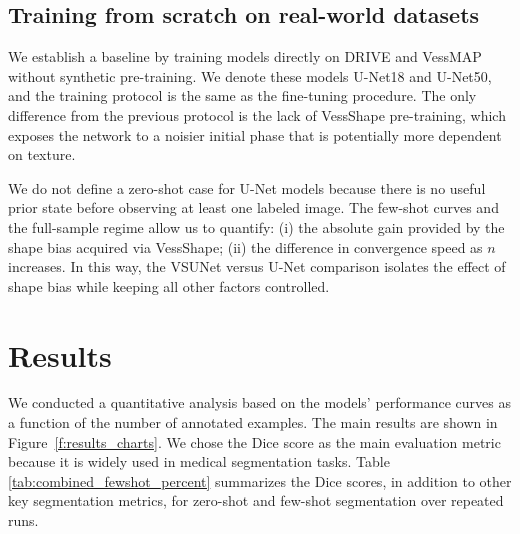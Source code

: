 \documentclass[%
reprint,
nofootinbib,
 amsmath,amssymb,
aps,
superscriptaddress,
showkeys,
longbibliography
]{revtex4-1}
\begin{document}
\subsection{Training from scratch on real-world datasets}

We establish a baseline by training models directly on DRIVE and VessMAP without synthetic pre-training. We denote these models U-Net18 and U-Net50, and the training protocol is the same as the fine-tuning procedure. The only difference from the previous protocol is the lack of VessShape pre-training, which exposes the network to a noisier initial phase that is potentially more dependent on texture.

We do not define a zero-shot case for U-Net models because there is no useful prior state before observing at least one labeled image. The few-shot curves and the full-sample regime allow us to quantify: (i) the absolute gain provided by the shape bias acquired via VessShape; (ii) the difference in convergence speed as $n$ increases. In this way, the VSUNet versus U-Net comparison isolates the effect of shape bias while keeping all other factors controlled.

\section{Results}
\label{s:results}

We conducted a quantitative analysis based on the models' performance curves as a function of the number of annotated examples. The main results are shown in Figure~\ref{f:results_charts}. We chose the Dice score as the main evaluation metric because it is widely used in medical segmentation tasks. Table \ref{tab:combined_fewshot_percent} summarizes the Dice scores, in addition to other key segmentation metrics, for zero-shot and few-shot segmentation over repeated runs.
\end{document}
